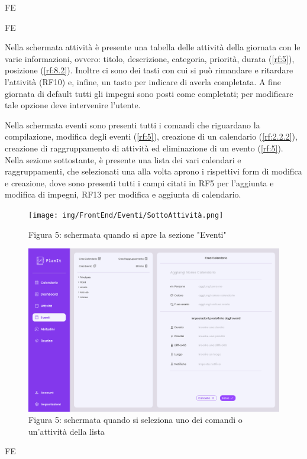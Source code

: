 \begin{listaPersonale}{FE}
\begin{listaPersonale2}{FE}
    \end{listaPersonale2}
    
     Nella schermata attività è presente una tabella delle attività della giornata con le varie informazioni, ovvero: titolo, descrizione, categoria, priorità, durata (\ref{rf:5}), posizione (\ref{rf:8.2}). Inoltre ci sono dei tasti con cui si può rimandare e ritardare l’attività (RF10) e, infine, un tasto per indicare di averla completata. A fine giornata di default tutti gli impegni sono posti come completati; per modificare tale opzione deve intervenire l’utente.
    
     Nella schermata eventi sono presenti tutti i comandi che riguardano la compilazione, modifica degli eventi (\ref{rf:5}), creazione di un calendario (\ref{rf:2.2.2}), creazione di raggruppamento di attività ed eliminazione di un evento (\ref{rf:5}).
    Nella sezione sottostante, è presente una lista dei vari calendari e raggruppamenti, che selezionati una alla volta aprono i rispettivi form di modifica e creazione, dove sono presenti tutti i campi citati in RF5 per l’aggiunta e modifica di impegni, RF13 per modifica e aggiunta di calendario. 
    \begin{figure}[H]
        \centering
        \texttt{[image: img/FrontEnd/Eventi/SottoAttività.png]}
        \caption{Figura 5: schermata quando si apre la sezione "Eventi"}
    \end{figure}
    \begin{figure}[H]
        \centering
        \includegraphics[width=1\textwidth]{img/FrontEnd/Eventi/Calendario/CreaCalendario.png}
        \caption{Figura 5: schermata quando si seleziona uno dei comandi o un'attività della lista}
    \end{figure}
    \begin{listaPersonale2}{FE}
        

\end{listaPersonale2}
\end{listaPersonale}
